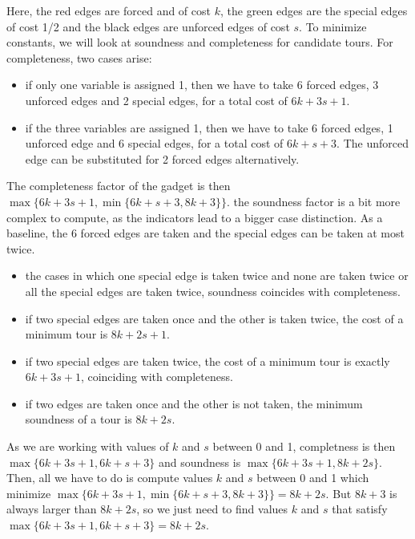 \documentclass[12pt]{article}
\begin{document}
Here, the red edges are forced and of cost $k$, the green edges are the special edges of cost 1/2 and the black edges are unforced edges of cost $s$.
To minimize constants, we will look at soundness and completeness for candidate tours. 
For completeness, two cases arise: 
\begin{itemize}
    \item if only one variable is assigned 1, then we have to take 6 forced edges, 3 unforced edges and 2 special edges, for a total cost of $6k+3s+1$.
    \item if the three variables are assigned 1, then we have to take 6 forced edges, 1 unforced edge and 6 special edges, for a total cost of $6k+s+3$. The unforced edge can be substituted for 2 forced edges alternatively.
\end{itemize}
The completeness factor of the gadget is then $\max\{6k+3s+1, \min\{6k+s+3, 8k+3\}\}$.
the soundness factor is a bit more complex to compute, as the indicators lead to a bigger case distinction. As a baseline, the 6 forced edges are taken and the special edges can be taken at most twice.
\begin{itemize}
        \item the cases in which one special edge is taken twice and none are taken twice or all the special edges are taken twice, soundness coincides with completeness.
        \item if two special edges are taken once and the other is taken twice, the cost of a minimum tour is $8k+2s+1$. 
        \item if two special edges are taken twice, the cost of a minimum tour is exactly $6k+3s+1$, coinciding with completeness.
        \item if two edges are taken once and the other is not taken, the minimum soundness of a tour is $8k+2s$. 
\end{itemize}
As we are working with values of $k$ and $s$ between 0 and 1, completness is then $\max\{6k+3s+1, 6k+s+3\}$ and soundness is $\max\{6k+3s+1, 8k+2s\}$.
Then, all we have to do is compute values $k$ and $s$ between 0 and 1 which minimize $\max\{6k+3s+1, \min\{6k+s+3, 8k+3\}\}=8k+2s$. But $8k+3$ is always larger than $8k+2s$, so we just need to find values $k$ and $s$ that satisfy $\max\{6k+3s+1, 6k+s+3\}=8k+2s$.
\end{document}

